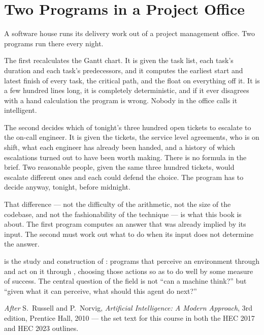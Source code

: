 \section{Two Programs in a Project Office}

A software house runs its delivery work out of a project management office. Two
programs run there every night.

The first recalculates the Gantt chart. It is given the task list, each task's
duration and each task's predecessors, and it computes the earliest start and
latest finish of every task, the critical path, and the float on everything off
it. It is a few hundred lines long, it is completely deterministic, and if it
ever disagrees with a hand calculation the program is wrong. Nobody in the office
calls it intelligent.

The second decides which of tonight's three hundred open tickets to escalate to
the on-call engineer. It is given the tickets, the service level agreements, who
is on shift, what each engineer has already been handed, and a history of which
escalations turned out to have been worth making. There is no formula in the
brief. Two reasonable people, given the same three hundred tickets, would escalate
different ones and each could defend the choice. The program has to decide anyway,
tonight, before midnight.

That difference --- not the difficulty of the arithmetic, not the size of the
codebase, and not the fashionability of the technique --- is what this book is
about. The first program computes an answer that was already implied by its
input. The second must work out what to do when its input does not determine the
answer.

\begin{definitionbox}
 is the study and construction of :
programs that perceive an environment through  and act on it
through , choosing those actions so as to do well by some measure of
success. The central question of the field is not ``can a machine think?'' but
``given what it can perceive, what should this agent do next?''

\smallskip
\noindent\emph{After} S.~Russell and P.~Norvig, \emph{Artificial Intelligence: A
Modern Approach}, 3rd edition, Prentice Hall, 2010 --- the set text for this
course in both the HEC 2017 and HEC 2023 outlines.
\end{definitionbox}

